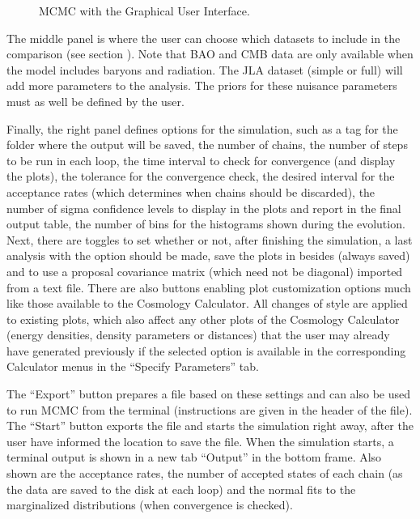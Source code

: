 \documentclass[letterpaper,12pt,english]{sphinxhowto}
\begin{document}
\begin{figure}[!tb]
\centering
\capstart

\noindent{}
\caption{MCMC with the Graphical User Interface.}\label{\detokenize{GUIMCMC:id1}}\end{figure}

The middle panel is where the user can choose which datasets to include in the
comparison (see section {\hyperref[\detokenize{thedata:datasec}]{}}).
Note that BAO and CMB data are only available when the model includes baryons
and radiation.
The JLA dataset (simple or full) will add more parameters to the analysis.
The priors for these nuisance parameters must as well be defined by the user.

Finally, the right panel defines options for the simulation, such as a tag for
the folder where the output will be saved, the number of chains, the number of
steps to be run in each loop, the time interval to check for convergence (and
display the plots), the tolerance for the convergence check, the desired
interval for the acceptance rates (which determines when chains should be
discarded), the number of sigma confidence levels to display in the plots and
report in the final output table, the number of bins for the histograms shown
during the evolution. Next, there are toggles to set whether or not, after
finishing the simulation, a last analysis with the  option should be
made, save the plots in  besides  (always saved) and to use a
proposal covariance matrix (which need not be diagonal) imported from a text
file.
There are also buttons enabling plot customization options much like those
available to the Cosmology Calculator.
All changes of style are applied to existing plots, which also affect any other
plots of the Cosmology Calculator (energy densities, density parameters or
distances) that the user may already have generated previously if the selected
option is available in the corresponding Calculator menus in the “Specify
Parameters” tab.

The “Export” button prepares a  file based on these settings and can
also be used to run MCMC from the terminal (instructions are given in the
header of the  file).
The “Start” button exports the  file and starts the simulation right
away, after the user have informed the location to save the file.
When the simulation starts, a terminal output is shown in a new tab “Output” in
the bottom frame.
Also shown are the acceptance rates, the number of accepted states of each
chain (as the data are saved to the disk at each loop) and the normal fits to
the marginalized distributions (when convergence is checked).
\end{document}
